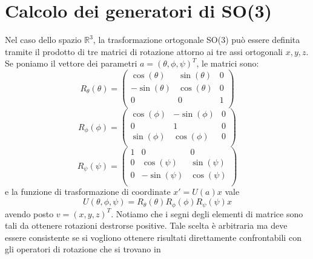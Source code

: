 \documentclass[fleqn,italian]{article}
\theoremstyle{definition}
\theoremstyle{remark}
\theoremstyle{plain}%
\theoremstyle{definition}
\theoremstyle{remark}
\numberwithin{equation}{section}
\numberwithin{thm}{section}
\begin{document}
\section{Calcolo dei generatori di SO(3)}

Nel caso dello spazio $\mathbb{R}^3$, la trasformazione ortogonale
SO(3) pu\`o essere definita tramite il prodotto di tre matrici di 
rotazione attorno ai tre assi ortogonali $x,y,z$. Se poniamo il 
vettore dei parametri $a=(\theta,\phi,\psi)^T$, le matrici sono:
\begin{equation}
R_\theta(\theta)=\begin{pmatrix} \cos(\theta) & \sin(\theta) & 0 \\
                                -\sin(\theta) & \cos(\theta) & 0 \\
                                       0      &       0      & 1 \\
                 \end{pmatrix}
\end{equation}
\begin{equation}
R_\phi(\phi)=\begin{pmatrix} \cos(\phi) & -\sin(\phi) & 0 \\
                                 0      &     1       & 0 \\
                             \sin(\phi) & \cos(\phi)  & 0 \\
                 \end{pmatrix}
\end{equation}
\begin{equation}
R_\psi(\psi)=\begin{pmatrix} 1  &      0      &      0     \\
                             0  & \cos(\psi)  & \sin(\psi) \\
                             0  & -\sin(\psi) & \cos(\psi) \\
                 \end{pmatrix}
\end{equation}
e la funzione di trasformazione di coordinate $x'=U(a)x$ vale 
\begin{equation}
U(\theta,\phi,\psi)=R_\theta(\theta)R_\phi(\phi)R_\psi(\psi)x
\end{equation}
avendo posto $v=(x,y,z)^T$. Notiamo che i segni degli elementi di
matrice sono tali da ottenere rotazioni destrorse positive. Tale scelta
\`e arbitraria ma deve essere consistente se si vogliono ottenere risultati
direttamente confrontabili con gli operatori di rotazione che si trovano in
\end{document}
